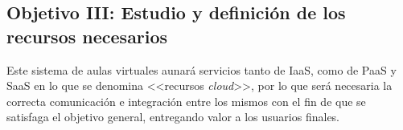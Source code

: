 \subsection{Objetivo III: Estudio y definición de los recursos necesarios}
Este sistema de aulas virtuales aunará servicios tanto de \acf{IaaS}, como de \acf{PaaS} y \acf{SaaS} en lo que se denomina <<recursos \textit{cloud}>>, por lo que será necesaria la correcta comunicación e integración entre los mismos con el fin de que se satisfaga el objetivo general, entregando valor a los usuarios finales.


